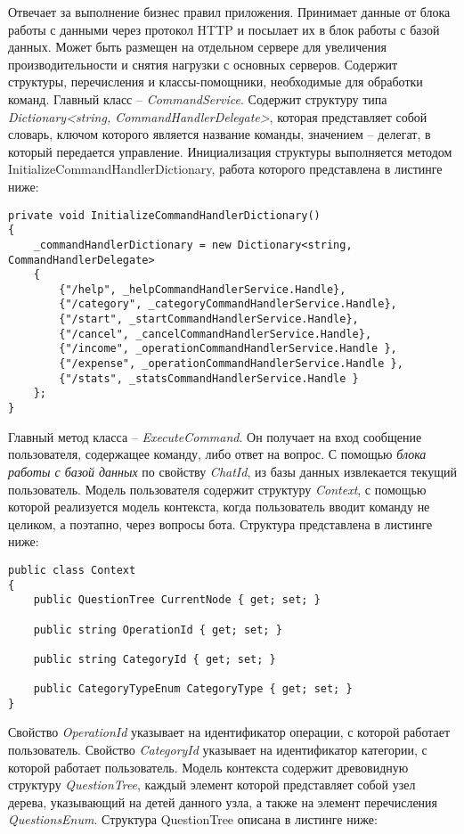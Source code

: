Отвечает за выполнение бизнес правил приложения. Принимает данные от блока работы с данными через протокол HTTP и посылает их в блок работы с базой данных. Может быть размещен на отдельном сервере для увеличения производительности и снятия нагрузки с основных серверов.
Содержит структуры, перечисления и классы-помощники, необходимые для обработки команд.
Главный класс – \emph{CommandService}. Содержит структуру типа \emph{Dictionary<string, CommandHandlerDelegate>}, которая представляет собой словарь, ключом которого является название команды, значением – делегат, в который передается управление.
Инициализация структуры выполняется методом InitializeCommandHandlerDictionary, работа которого представлена в листинге ниже:

\lstset{style=sharpc}
\begin{lstlisting}
private void InitializeCommandHandlerDictionary()
{
	_commandHandlerDictionary = new Dictionary<string, CommandHandlerDelegate>
	{
		{"/help", _helpCommandHandlerService.Handle},
		{"/category", _categoryCommandHandlerService.Handle},
		{"/start", _startCommandHandlerService.Handle},
		{"/cancel", _cancelCommandHandlerService.Handle},
		{"/income", _operationCommandHandlerService.Handle },
		{"/expense", _operationCommandHandlerService.Handle },
		{"/stats", _statsCommandHandlerService.Handle }
	};
}
\end{lstlisting}

Главный метод класса – \emph{ExecuteCommand}. Он получает на вход сообщение пользователя, содержащее команду, либо ответ на вопрос. С помощью \emph{блока работы с базой данных} по свойству \emph{ChatId}, из базы данных извлекается текущий пользователь.
Модель пользователя содержит структуру \emph{Context}, с помощью которой реализуется модель контекста, когда пользователь вводит команду не целиком, а поэтапно, через вопросы бота. Структура представлена в листинге ниже:

\lstset{style=sharpc}
\begin{lstlisting}
public class Context
{
	public QuestionTree CurrentNode { get; set; }

	public string OperationId { get; set; }

	public string CategoryId { get; set; }

	public CategoryTypeEnum CategoryType { get; set; }
}
\end{lstlisting}

Свойство \emph{OperationId} указывает на идентификатор операции, с которой работает пользователь.
Свойство \emph{CategoryId} указывает на идентификатор категории, с которой работает пользователь.
Модель контекста содержит древовидную структуру \emph{QuestionTree}, каждый элемент которой представляет собой узел дерева, указывающий на детей данного узла, а также на элемент перечисления \emph{QuestionsEnum}. Структура QuestionTree описана в листинге ниже:

